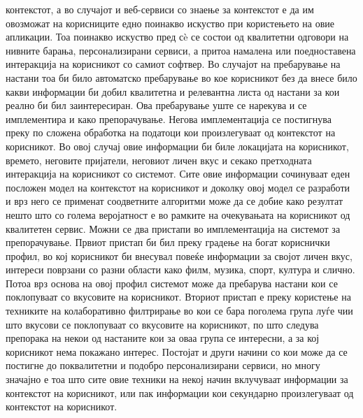 контекстот, а во случајот и веб-сервиси со знаење за контекстот е да им
овозможат на корисниците едно поинакво искуство при користењето на овие
апликации. Тоа поинакво искуство пред сè се состои од квалитетни одговори на
нивните барања, персонализирани сервиси, а притоа намалена или поедноставена
интеракција на корисникот со самиот софтвер. Во случајот на пребарување на
настани тоа би било автоматско пребарување во кое корисникот без да внесе било
какви информации би добил квалитетна и релевантна листа од настани за кои реално
би бил заинтересиран. Ова пребарување уште се нарекува и се имплементира и како
препорачување. Негова имплементација се постигнува преку по сложена обработка на
податоци кои произлегуваат од контекстот на корисникот. Во овој случај овие
информации би биле локацијата на корисникот, времето, неговите пријатели,
неговиот личен вкус и секако претходната интеракција на корисникот со системот.
Сите овие информации сочинуваат еден посложен модел на контекстот на корисникот
и доколку овој модел се разработи и врз него се применат соодветните алгоритми
може да се добие како резултат нешто што со голема веројатност е во рамките на
очекувањата на корисникот од квалитетен сервис. Можни се два пристапи во
имплементација на системот за препорачување. Првиот пристап би бил преку градење
на богат кориснички профил, во кој корисникот би внесувал повеќе информации за
својот личен вкус, интереси поврзани со разни области како филм, музика, спорт,
култура и слично. Потоа врз основа на овој профил системот може да пребарува
настани кои се поклопуваат со вкусовите на корисникот. Вториот пристап е преку
користење на техниките на колаборативно филтрирање во кои се бара поголема група
луѓе чии што вкусови се поклопуваат со вкусовите на корисникот, по што следува
препорака на некои од настаните кои за оваа група се интересни, а за кој
корисникот нема покажано интерес. Постојат и други начини со кои може да се
постигне до поквалитетни и подобро персонализирани сервиси, но многу значајно е
тоа што сите овие техники на некој начин вклучуваат информации за контекстот на
корисникот, или пак информации кои секундарно произлегуваат од контекстот на
корисникот.

